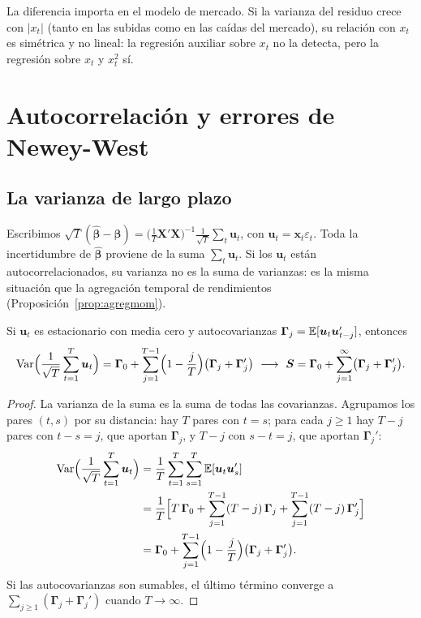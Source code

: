 \begin{observacion}
La diferencia importa en el modelo de mercado. Si la varianza del residuo crece con $|x_t|$ (tanto en las
subidas como en las caídas del mercado), su relación con $x_t$ es simétrica y no lineal: la regresión
auxiliar sobre $x_t$ no la detecta, pero la regresión sobre $x_t$ y $x_t^2$ sí.
\end{observacion}

\section{Autocorrelación y errores de Newey-West}

\subsection{La varianza de largo plazo}

Escribimos $\sqrt T(\hat{\bm\beta}-\bm\beta)=\bigl(\tfrac1T\bm X'\bm X\bigr)^{-1}\tfrac{1}{\sqrt T}\sum_t\bm u_t$,
con $\bm u_t=\bm x_t\varepsilon_t$. Toda la incertidumbre de $\hat{\bm\beta}$ proviene de la suma
$\sum_t\bm u_t$. Si los $\bm u_t$ están autocorrelacionados, su varianza no es la suma de varianzas: es la
misma situación que la agregación temporal de rendimientos (Proposición~\ref{prop:agregmom}).

\begin{proposicion}\label{prop:vlp}
Si $\bm u_t$ es estacionario con media cero y autocovarianzas $\bm\Gamma_j=\mathbb{E}[\bm u_t\bm u_{t-j}']$, entonces
\[
  \operatorname{Var}\Bigl(\frac1{\sqrt T}\sum_{t=1}^T\bm u_t\Bigr)=\bm\Gamma_0+\sum_{j=1}^{T-1}\Bigl(1-\frac jT\Bigr)
  \bigl(\bm\Gamma_j+\bm\Gamma_j'\bigr)\ \longrightarrow\ \bm S=\bm\Gamma_0+\sum_{j=1}^{\infty}\bigl(\bm\Gamma_j+\bm\Gamma_j'\bigr).
\]
\end{proposicion}

\begin{proof}
La varianza de la suma es la suma de todas las covarianzas. Agrupamos los pares $(t,s)$ por su distancia:
hay $T$ pares con $t=s$; para cada $j\ge1$ hay $T-j$ pares con $t-s=j$, que aportan $\bm\Gamma_j$, y $T-j$
con $s-t=j$, que aportan $\bm\Gamma_j'$:
\begin{align*}
  \operatorname{Var}\Bigl(\frac1{\sqrt T}\sum_{t=1}^T\bm u_t\Bigr)
    &= \frac1T\sum_{t=1}^T\sum_{s=1}^T\mathbb{E}[\bm u_t\bm u_s']\\
    &= \frac1T\Bigl[T\,\bm\Gamma_0+\sum_{j=1}^{T-1}(T-j)\,\bm\Gamma_j+\sum_{j=1}^{T-1}(T-j)\,\bm\Gamma_j'\Bigr]\\
    &= \bm\Gamma_0+\sum_{j=1}^{T-1}\Bigl(1-\frac jT\Bigr)\bigl(\bm\Gamma_j+\bm\Gamma_j'\bigr).
\end{align*}
Si las autocovarianzas son sumables, el último término converge a $\sum_{j\ge1}(\bm\Gamma_j+\bm\Gamma_j')$
cuando $T\to\infty$.
\end{proof}

